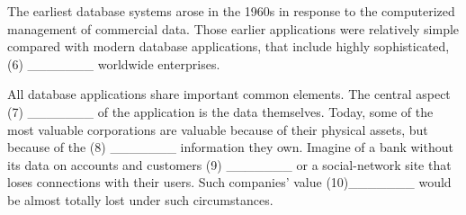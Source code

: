\documentclass[UTF8,11pt]{ctexart}
\begin{document}
The earliest database systems arose in the 1960s in response to the computerized management of commercial data. Those earlier applications were relatively simple compared with modern database applications, that include highly sophisticated, (6) \_\_\_\_\_\_\_ worldwide enterprises.


All database applications share important common elements. The central aspect (7) \_\_\_\_\_\_\_ of the application is the data themselves. Today, some of the most valuable corporations are valuable because of their physical assets, but because of the (8) \_\_\_\_\_\_\_ information they own. Imagine of a bank without its data on accounts and customers (9) \_\_\_\_\_\_\_ or a social-network site that loses connections with their users. Such companies’ value (10)\_\_\_\_\_\_\_ would be almost totally lost under such circumstances.
\end{document}
